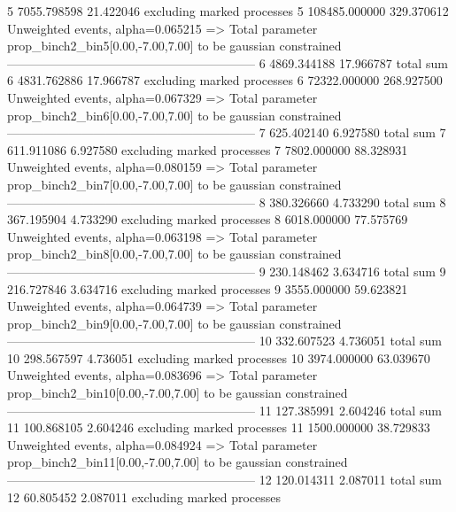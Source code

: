 5          7055.798598     21.422046       excluding marked processes    
5          108485.000000   329.370612      Unweighted events, alpha=0.065215
  => Total parameter prop_binch2_bin5[0.00,-7.00,7.00] to be gaussian constrained
------------------------------------------------------------
6          4869.344188     17.966787       total sum                     
6          4831.762886     17.966787       excluding marked processes    
6          72322.000000    268.927500      Unweighted events, alpha=0.067329
  => Total parameter prop_binch2_bin6[0.00,-7.00,7.00] to be gaussian constrained
------------------------------------------------------------
7          625.402140      6.927580        total sum                     
7          611.911086      6.927580        excluding marked processes    
7          7802.000000     88.328931       Unweighted events, alpha=0.080159
  => Total parameter prop_binch2_bin7[0.00,-7.00,7.00] to be gaussian constrained
------------------------------------------------------------
8          380.326660      4.733290        total sum                     
8          367.195904      4.733290        excluding marked processes    
8          6018.000000     77.575769       Unweighted events, alpha=0.063198
  => Total parameter prop_binch2_bin8[0.00,-7.00,7.00] to be gaussian constrained
------------------------------------------------------------
9          230.148462      3.634716        total sum                     
9          216.727846      3.634716        excluding marked processes    
9          3555.000000     59.623821       Unweighted events, alpha=0.064739
  => Total parameter prop_binch2_bin9[0.00,-7.00,7.00] to be gaussian constrained
------------------------------------------------------------
10         332.607523      4.736051        total sum                     
10         298.567597      4.736051        excluding marked processes    
10         3974.000000     63.039670       Unweighted events, alpha=0.083696
  => Total parameter prop_binch2_bin10[0.00,-7.00,7.00] to be gaussian constrained
------------------------------------------------------------
11         127.385991      2.604246        total sum                     
11         100.868105      2.604246        excluding marked processes    
11         1500.000000     38.729833       Unweighted events, alpha=0.084924
  => Total parameter prop_binch2_bin11[0.00,-7.00,7.00] to be gaussian constrained
------------------------------------------------------------
12         120.014311      2.087011        total sum                     
12         60.805452       2.087011        excluding marked processes    
